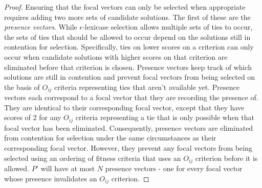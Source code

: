 \documentclass[sigconf]{acmart}
\begin{document}
\begin{proof}
\vspace{2em}

Ensuring that the focal vectors can only be selected when appropriate requires adding two more sets of candidate solutions. The first of these are the \textit{presence vectors}. While $\epsilon$-lexicase selection allows multiple sets of ties to occur, the sets of ties that should be allowed to occur depend on the solutions still in contention for selection. Specifically, ties on lower scores on a criterion can only occur when candidate solutions with higher scores on that criterion are eliminated before that criterion is chosen. Presence vectors keep track of which solutions are still in contention and prevent focal vectors from being selected on the basis of $O_{ij}$ criteria representing ties that aren't available yet. Presence vectors each correspond to a focal vector that they are recording the presence of. They are identical to their corresponding focal vector, except that they have scores of 2 for any $O_{ij}$ criteria representing a tie that is only possible when that focal vector has been eliminated. Consequently, presence vectors are eliminated from contention for selection under the same circumstances as their corresponding focal vector. However, they prevent any focal vectors from being selected using an ordering of fitness criteria that uses an $O_{ij}$ criterion before it is allowed. $P'$ will have at most $N$ presence vectors - one for every focal vector whose presence invalidates an $O_{ij}$ criterion.

\vspace{2em}


\end{proof}
\end{document}
